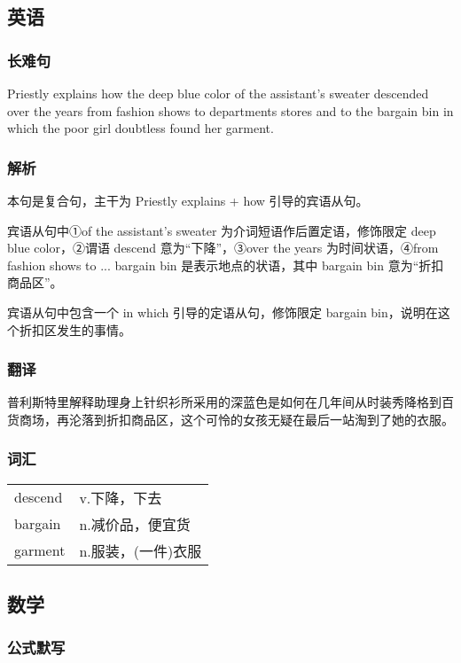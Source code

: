 \documentclass[UTF8]{ctexart}
\begin{document}
\subsection{英语}
\subsubsection{长难句}
Priestly explains how the deep blue color of the assistant's sweater descended over the years from fashion shows to departments stores and to the bargain bin in which the poor girl doubtless found her garment.
\subsubsection{解析}
本句是复合句，主干为 Priestly explains + how 引导的宾语从句。

宾语从句中①of the assistant's sweater 为介词短语作后置定语，修饰限定 deep blue color，②谓语 descend 意为“下降”，③over the years 为时间状语，④from fashion shows to ... bargain bin 是表示地点的状语，其中 bargain bin 意为“折扣商品区”。

宾语从句中包含一个 in which 引导的定语从句，修饰限定 bargain bin，说明在这个折扣区发生的事情。
\subsubsection{翻译}
普利斯特里解释助理身上针织衫所采用的深蓝色是如何在几年间从时装秀降格到百货商场，再沦落到折扣商品区，这个可怜的女孩无疑在最后一站淘到了她的衣服。
\subsubsection{词汇}
\begin{table}[h]
      \centering
      \begin{tabular}{p{}p{}}
            descend & v.下降，下去     \\
            bargain & n.减价品，便宜货   \\
            garment & n.服装，(一件)衣服
      \end{tabular}
\end{table}

\subsection{数学}
\subsubsection{公式默写}
\end{document}
